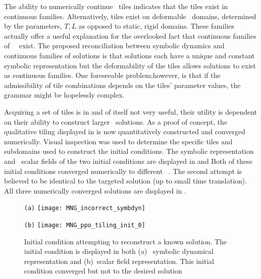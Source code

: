 The ability to numerically continue \spt\ tiles indicates
that the tiles exist in continuous families. Alternatively, tiles exist on deformable \spt\ domains, determined by the parameters, $T,L$ as opposed to static, rigid domains.
These families actually offer a useful explanation for the overlooked fact that continuous families of \spt\ \twots\ exist.
The proposed reconciliation between symbolic dynamics and continuous families of solutions is that solutions each have a unique and constant symbolic representation but the deformability
of the tiles allows solutions to exist as continuous families.
One foreseeable problem;however, is that if the admissibility of tile combinations
depends on the tiles' parameter values, the grammar might be hopelessly complex.

Acquiring a set of tiles is in and of itself not very useful, their utility is dependent on their ability to construct larger \spt\ solutions.
As a proof of concept, the qualitative tiling displayed in  is
now quantitatively constructed and converged numerically.
Visual inspection was used to determine the specific tiles and subdomains used to construct the initial conditions.
The symbolic representation and \spt\ scalar fields
of the two initial conditions are displayed in  and 
Both of these initial conditions converged numerically to different \spt\ \twots{}.
The second attempt is believed to be identical to the targeted solution (up to small
time translation). All three numerically
converged solutions are displayed in .

\begin{figure} %
\centering
\begin{minipage}[height=.3\textheight]{.3\textwidth}
\centering \small{\texttt{(a)}}
\texttt{[image: MNG\_incorrect\_symbdyn]}
\end{minipage}
\begin{minipage}[height=.35\textheight]{.35\textwidth}
\centering \small{\texttt{(b)}}
\texttt{[image: MNG\_ppo\_tiling\_init\_0]}
\end{minipage}
\caption{ \label{fig:MNGsymbolsfail}
Initial condition attempting to reconstruct a known solution.
The initial condition is displayed in both (a) \spt\ symbolic dynamical representation
and (b)\spt\ scalar field representation. This initial condition converged but not
to the desired solution
}
\end{figure}

